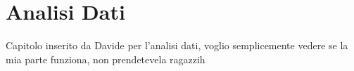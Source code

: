 \section{Analisi Dati}
Capitolo inserito da Davide per l'analisi dati, voglio semplicemente vedere se la mia parte funziona, non prendetevela ragazzih\\




